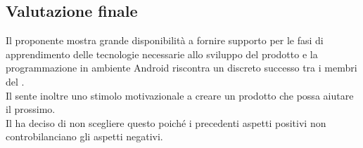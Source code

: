 \subsection {Valutazione finale}
Il proponente mostra grande disponibilità a fornire supporto per le fasi di apprendimento delle tecnologie necessarie allo sviluppo del prodotto e la programmazione in ambiente Android riscontra un discreto successo tra i membri del . \\
Il  sente inoltre uno stimolo motivazionale a creare un prodotto che possa aiutare il prossimo. \\
Il  ha deciso di non scegliere questo  poiché i precedenti aspetti positivi non controbilanciano gli aspetti negativi.
